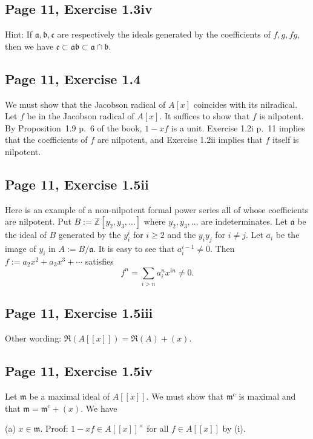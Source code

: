 \documentclass[parskip=half,fontsize=12pt]{scrartcl}%
\newcommand{\oo}{\operatorname}\newcommand{\ooo}{\operatorname*}
\newcommand{\mf}{\mathfrak}
\newcommand{\aaa}{\mf a}
\newcommand{\bbb}{\mf b}
\newcommand{\ccc}{\mf c}
\newcommand{\mmm}{\mf m}
\begin{document}
\subsection{Page 11, Exercise 1.3iv}%

Hint: If $\aaa,\bbb,\ccc$ are respectively the ideals generated by the coefficients of $f,g,fg$, then we have $\ccc\subset\aaa\bbb\subset\aaa\cap\bbb$.  

\subsection{Page 11, Exercise 1.4}%

We must show that the Jacobson radical of $A[x]$ coincides with its nilradical. Let $f$ be in the Jacobson radical of $A[x]$. It suffices to show that $f$ is nilpotent. By Proposition~1.9 p.~6 of the book, $1-xf$ is a unit. Exercise 1.2i p.~11 implies that the coefficients of $f$ are nilpotent, and Exercise 1.2ii implies that $f$ itself is nilpotent.

\subsection{Page 11, Exercise 1.5ii}%

Here is an example of a non-nilpotent formal power series all of whose coefficients are nilpotent. Put $B:=\mathbb Z[y_2,y_3,\dots]$ where $y_2,y_3,\dots$ are indeterminates. Let $\aaa$ be the ideal of $B$ generated by the $y_i^i$ for $i\ge2$ and the $y_iy_j$ for $i\neq j$. Let $a_i$ be the image of $y_i$ in $A:=B/\aaa$. It is easy to see that $a_i^{i-1}\neq0$. Then $f:=a_2x^2+a_3x^3+\cdots$ satisfies 
$$
f^n=\sum_{i>n}a_i^nx^{in}\neq0.
$$

\subsection{Page 11, Exercise 1.5iii}%

Other wording: $\mf R(A[[x]])=\mf R(A)+(x)$.

\subsection{Page 11, Exercise 1.5iv}

Let $\mmm$ be a maximal ideal of $A[[x]]$. We must show that $\mmm^{\oo c}$ is maximal and that $\mmm=\mmm^{\oo c}+(x)$. We have 

(a) $x\in\mmm$. Proof: $1-xf\in A[[x]]^\times$ for all $f\in A[[x]]$ by (i).
\end{document}
